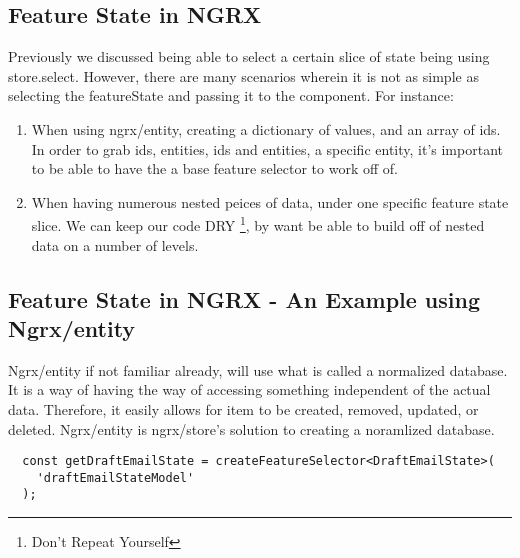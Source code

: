 \subsection{ Feature State in NGRX }
Previously we discussed being able to select a certain slice of state being
using store.select. However, there are many scenarios wherein it is not
as simple as selecting the featureState and passing it to the component. For
instance:
\begin{enumerate}
  \item When using ngrx/entity, creating a dictionary of values, and an array
  of ids. In order to grab ids, entities, ids and entities, a specific entity,
  it's important to be able to have the a base feature selector to work off of.
  \item When having numerous nested peices of data, under one specific feature
  state slice. We can keep our code DRY \footnote{Don't Repeat Yourself}, by
  want be able to build off of nested data on a number of levels.
\end{enumerate}


\subsection{ Feature State in NGRX - An Example using Ngrx/entity}

Ngrx/entity if not familiar already, will use what is called a normalized
database. It is a way of having the way of accessing something independent of
the actual data. Therefore, it easily allows for item to be created, removed,
updated, or deleted. Ngrx/entity is ngrx/store's solution to creating a
noramlized database. 

\begin{lstlisting}
  const getDraftEmailState = createFeatureSelector<DraftEmailState>(
    'draftEmailStateModel'
  );
\end{lstlisting}
